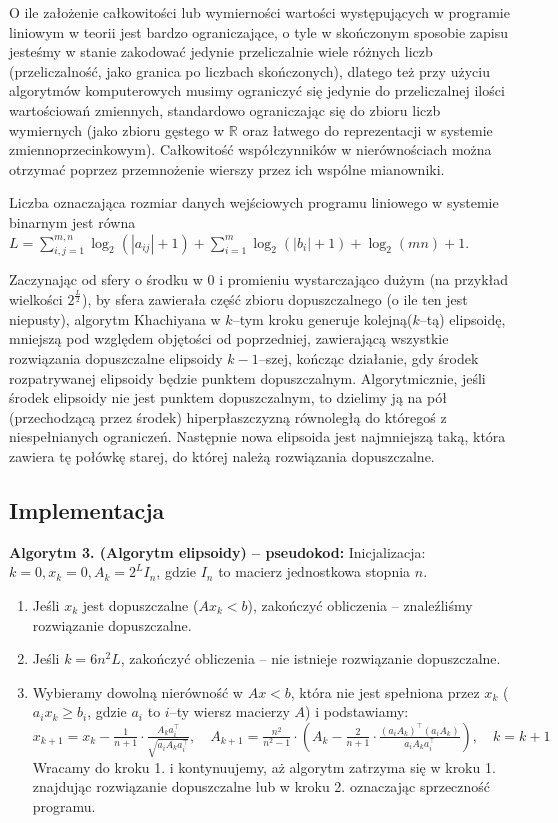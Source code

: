 \documentclass[licencjacka]{pracamgr}
\begin{document}
O ile założenie całkowitości lub wymierności wartości występujących w programie liniowym w teorii jest bardzo ograniczające, o tyle w skończonym sposobie zapisu jesteśmy w stanie zakodować
jedynie przeliczalnie wiele różnych liczb (przeliczalność, jako granica po liczbach skończonych), dlatego też przy użyciu algorytmów komputerowych musimy ograniczyć się jedynie do przeliczalnej
ilości wartościowań zmiennych, standardowo ograniczając się do zbioru liczb wymiernych (jako zbioru gęstego w $\mathbb{R}$ oraz łatwego do reprezentacji w systemie zmiennoprzecinkowym).
Całkowitość współczynników w nierównościach można otrzymać poprzez przemnożenie wierszy przez ich wspólne mianowniki.

Liczba oznaczająca rozmiar danych wejściowych programu liniowego w systemie binarnym jest równa 
$L=\sum\limits_{i,j=1}^{m,n}\log_2{(|a_{ij}|+1)}+\sum\limits_{i=1}^{m}\log_2{(|b_i|+1)}+\log_2{(mn)}+1$.

Zaczynając od sfery o środku w $0$ i promieniu wystarczająco dużym (na przykład wielkości $2^{\frac{L}{2}}$), by sfera zawierała część zbioru dopuszczalnego (o ile ten jest niepusty),
algorytm Khachiyana w $k$--tym kroku generuje kolejną($k$--tą) elipsoidę, mniejszą pod względem objętości od poprzedniej, zawierającą wszystkie rozwiązania dopuszczalne elipsoidy $k-1$--szej,
kończąc działanie, gdy środek rozpatrywanej elipsoidy będzie punktem dopuszczalnym.\newline
Algorytmicznie, jeśli środek elipsoidy nie jest punktem dopuszczalnym, to dzielimy ją na pół (przechodzącą przez środek) hiperpłaszczyzną równoległą do któregoś z niespełnianych ograniczeń.
Następnie nowa elipsoida jest najmniejszą taką, która zawiera tę połówkę starej, do której należą rozwiązania dopuszczalne.
%
   \subsection{Implementacja}
\textbf{Algorytm 3. (Algorytm elipsoidy) -- pseudokod:}\newline\newline 
Inicjalizacja: $k=0, x_k=0, A_k=2^{L}I_n$, gdzie $I_n$ to macierz jednostkowa stopnia $n$.
\begin{enumerate}
\item Jeśli $x_k$ jest dopuszczalne ($Ax_k<b$), zakończyć obliczenia -- znaleźliśmy rozwiązanie dopuszczalne.
%
\item Jeśli $k=6n^2L$, zakończyć obliczenia -- nie istnieje rozwiązanie dopuszczalne.
%
\item Wybieramy dowolną nierówność w $Ax<b$, która nie jest spełniona przez $x_k$ ($a_ix_k\ge b_i$, gdzie $a_i$ to $i$--ty wiersz macierzy $A$) i podstawiamy:\newline
%
$x_{k+1}=x_k-\frac{1}{n+1}\cdot\frac{A_ka_i^{\top}}{\sqrt{a_iA_ka_i^{\top}}},\quad
A_{k+1}=\frac{n^2}{n^2-1}\cdot\left(A_k-\frac{2}{n+1}\cdot\frac{(a_iA_k)^{\top}(a_iA_k)}{a_iA_ka_i^{\top}}\right),\quad
k=k+1$\newline\newline
Wracamy do kroku 1. i kontynuujemy, aż algorytm zatrzyma się w kroku 1. znajdując rozwiązanie dopuszczalne lub w kroku 2. oznaczając sprzeczność programu.
\end{enumerate}
\end{document}
